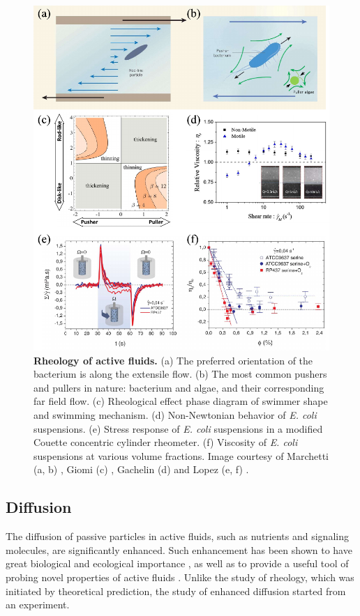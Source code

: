 \begin{figure}[!htbp]
	\begin{center}
	\includegraphics[width=5.5 in]{Figs/1-Intro/2.pdf}
	\end{center}
	\caption[Figure 1.2: ]
	{
	\textbf{Rheology of active fluids.}
	(a) The preferred orientation of the bacterium is along the extensile flow.
	(b) The most common pushers and pullers in nature: bacterium and algae, and their corresponding far field flow.
	(c) Rheological effect phase diagram of swimmer shape and swimming mechanism.
	(d) Non-Newtonian behavior of \textit{E. coli} suspensions.
	(e) Stress response of \textit{E. coli} suspensions in a modified Couette concentric cylinder rheometer.
	(f) Viscosity of \textit{E. coli} suspensions at various volume fractions.
	Image courtesy of Marchetti (a, b) \cite{Marchetti2015}, Giomi (c) \cite{Giomi2010}, Gachelin (d) \cite{Gachelin2013} and Lopez (e, f) \cite{Lopez2015}.
	}
	\label{fig:1-2}
\end{figure}


\subsection{Diffusion}
\label{sec:diffusion}
The diffusion of passive particles in active fluids, such as nutrients and signaling molecules, are significantly enhanced. Such enhancement has been shown to have great biological and ecological importance \cite{Wu2000, Kurtuldu2011, Morozov2014}, as well as to provide a useful tool of probing novel properties of active fluids \cite{Squires2010}. Unlike the study of rheology, which was initiated by theoretical prediction, the study of enhanced diffusion started from an experiment.

